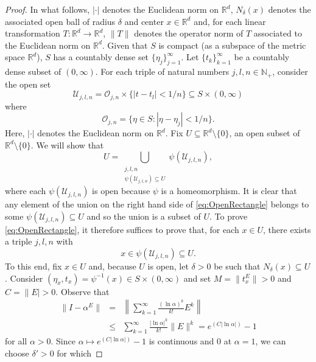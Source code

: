 \documentclass[11pt]{article}
\theoremstyle{theorem}
\begin{document}
\begin{proof}
In what follows, $|\cdot|$ denotes the Euclidean norm on $\mathbb{R}^d$, $N_\delta(x)$ denotes the associated open ball of radius $\delta$ and center $x\in\mathbb{R}^d$ and, for each linear transformation $T:\mathbb{R}^d\to\mathbb{R}^d$, $\|T\|$ denotes the operator norm of $T$ associated to the Euclidean norm on $\mathbb{R}^d$. Given that $S$ is compact (as a subspace of the metric space $\mathbb{R}^d$), $S$ has a countably dense set $\{\eta_j\}_{j=1}^\infty$. Let $\{t_k\}_{k=1}^\infty$ be a countably dense subset of $(0,\infty)$. For each triple of natural numbers $j,l,n\in\mathbb{N}_+$, consider the open set
\begin{equation*}
\mathcal{U}_{j,l,n}=\mathcal{O}_{j,n}\times \{ \vert t - t_l \vert < 1/n \}\subseteq S\times (0,\infty)
\end{equation*}
where
\begin{equation*}
\mathcal{O}_{j,n}=\{\eta\in S: |\eta-\eta_j|<1/n\}.
\end{equation*}
Here, $|\cdot|$ denotes the Euclidean norm on $\mathbb{R}^d$. Fix $U\subseteq \mathbb{R}^d\setminus \{0\}$, an open subset of $\mathbb{R}^d\setminus\{0\}$. We will show that
\begin{equation}\label{eq:OpenRectangle}
U=\bigcup_{\substack{j,l,n\\ \psi(\mathcal{U}_{j,l,n})\subseteq U}}\psi(\mathcal{U}_{j,l,n}),
\end{equation}
where each $\psi(\mathcal{U}_{j,l,n})$ is open because $\psi$ is a homeomorphism. It is clear that any element of the union on the right hand side of \eqref{eq:OpenRectangle} belongs to some $\psi(\mathcal{U}_{j,l,n}) \subseteq U$ and so the union is a subset of $U$. To prove \eqref{eq:OpenRectangle}, it therefore suffices to prove that, for each $x\in U$, there exists a triple $j,l,n$ with
\begin{equation*}
x\in\psi(\mathcal{U}_{j,l,n})\subseteq U.
\end{equation*}
To this end, fix $x\in U$ and, because $U$ is open, let $\delta>0$ be such that $N_{\delta}(x)\subseteq U$. Consider $(\eta_x,t_x)=\psi^{-1}(x)\in S\times (0,\infty)$ and set $M=\|t_x^E\|>0$ and $C=\|E|>0$. Observe that 
\begin{eqnarray*}
\|I-\alpha^E\|&=&\left\|\sum_{k=1}^\infty \frac{(\ln \alpha)^k}{k!} E^k\right\|\\
&\leq &\sum_{k=1}^\infty \frac{|\ln \alpha|^k}{k!} \|E\|^k=e^{(C|\ln \alpha|)}-1
\end{eqnarray*}
for all $\alpha>0$. Since $\alpha\mapsto e^{(C|\ln \alpha|)}-1$ is continuous and $0$ at $\alpha=1$, we can choose $\delta'>0$ for which

\end{proof}
\end{document}

